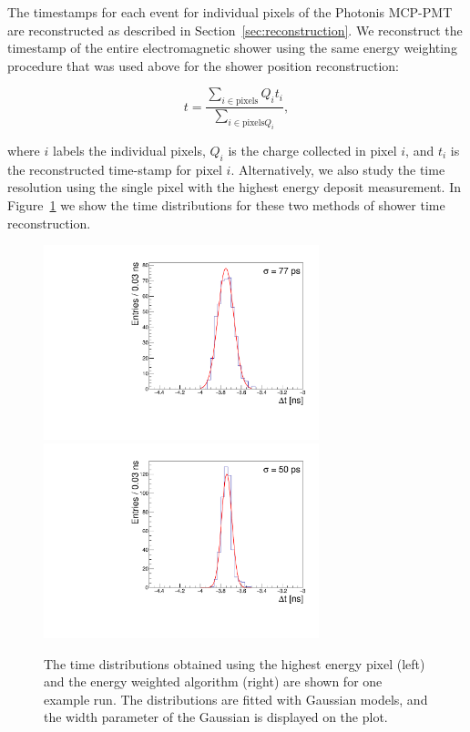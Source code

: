 The timestamps for each event for individual pixels of the Photonis MCP-PMT are
reconstructed as described in Section~\ref{sec:reconstruction}. We reconstruct
the timestamp of the entire electromagnetic shower using the same energy
weighting procedure that was used above for the shower position reconstruction:

\begin{equation} t =\frac{\sum_{i\in\mathrm{pixels}} Q_{i} t_{i}}
{\sum_{i\in\mathrm{pixels} Q_{i}}}, 
\label{eqn:EnergyWeightedTimestamp}
\end{equation} 

where $i$ labels the individual pixels, $Q_{i}$ is the charge
collected in pixel $i$, and $t_{i}$ is the reconstructed time-stamp for pixel
$i$. Alternatively, we also study the time resolution using the single pixel
with the highest energy deposit measurement. In Figure~\ref{fig:exdt} we show
the time distributions for these two methods of shower time reconstruction.

\begin{figure}[htbp] 
\centering
\includegraphics[width=8cm]{Images/exdt/exdtHI.pdf}
\includegraphics[width=8cm]{Images/exdt/exdtWI.pdf} 
\caption{\small The time distributions obtained using the highest energy pixel (left) and the energy weighted algorithm (right) are shown for one example run. The distributions are
fitted with Gaussian models, and the width parameter of the Gaussian is
displayed on the plot.} 
\label{fig:exdt} 
\end{figure} 

